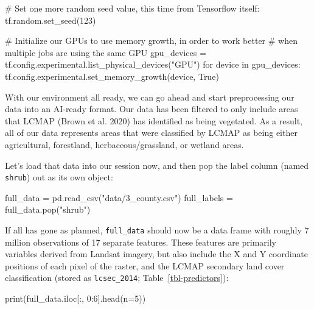 \documentclass[
  letterpaper,
  DIV=11,
  numbers=noendperiod]{scrartcl}
\newenvironment{Shaded}{\begin{snugshade}}{\end{snugshade}}
\newcommand{\BuiltInTok}[1]{\textcolor[rgb]{0.00,0.23,0.31}{#1}}
\newcommand{\CommentTok}[1]{\textcolor[rgb]{0.37,0.37,0.37}{#1}}
\newcommand{\ControlFlowTok}[1]{\textcolor[rgb]{0.00,0.23,0.31}{#1}}
\newcommand{\DecValTok}[1]{\textcolor[rgb]{0.68,0.00,0.00}{#1}}
\newcommand{\KeywordTok}[1]{\textcolor[rgb]{0.00,0.23,0.31}{#1}}
\newcommand{\NormalTok}[1]{\textcolor[rgb]{0.00,0.23,0.31}{#1}}
\newcommand{\OperatorTok}[1]{\textcolor[rgb]{0.37,0.37,0.37}{#1}}
\newcommand{\StringTok}[1]{\textcolor[rgb]{0.13,0.47,0.30}{#1}}
\newcommand{\VariableTok}[1]{\textcolor[rgb]{0.07,0.07,0.07}{#1}}
\begin{document}
\begin{Shaded}
\begin{Highlighting}[]
\CommentTok{\# Set one more random seed value, this time from Tensorflow itself:}
\NormalTok{tf.random.set\_seed(}\DecValTok{123}\NormalTok{)}

\CommentTok{\# Initialize our GPUs to use memory growth, in order to work better}
\CommentTok{\# when multiple jobs are using the same GPU}
\NormalTok{gpu\_devices }\OperatorTok{=}\NormalTok{ tf.config.experimental.list\_physical\_devices(}\StringTok{"GPU"}\NormalTok{)}
\ControlFlowTok{for}\NormalTok{ device }\KeywordTok{in}\NormalTok{ gpu\_devices:}
\NormalTok{    tf.config.experimental.set\_memory\_growth(device, }\VariableTok{True}\NormalTok{)}
\end{Highlighting}
\end{Shaded}

With our environment all ready, we can go ahead and start preprocessing
our data into an AI-ready format. Our data has been filtered to only
include areas that LCMAP (Brown et al. 2020) has identified as being
vegetated. As a result, all of our data represents areas that were
classified by LCMAP as being either agricultural, forestland,
herbaceous/grassland, or wetland areas.

Let's load that data into our session now, and then pop the label column
(named \texttt{shrub}) out as its own object:

\begin{Shaded}
\begin{Highlighting}[]
\NormalTok{full\_data }\OperatorTok{=}\NormalTok{ pd.read\_csv(}\StringTok{"data/3\_county.csv"}\NormalTok{)}
\NormalTok{full\_labels }\OperatorTok{=}\NormalTok{ full\_data.pop(}\StringTok{"shrub"}\NormalTok{)}
\end{Highlighting}
\end{Shaded}

If all has gone as planned, \texttt{full\_data} should now be a data
frame with roughly 7 million observations of 17 separate features. These
features are primarily variables derived from Landsat imagery, but also
include the X and Y coordinate positions of each pixel of the raster,
and the LCMAP secondary land cover classification (stored as
\texttt{lcsec\_2014}; Table~\ref{tbl-predictors}):

\begin{Shaded}
\begin{Highlighting}[]
\BuiltInTok{print}\NormalTok{(full\_data.iloc[:, }\DecValTok{0}\NormalTok{:}\DecValTok{6}\NormalTok{].head(n}\OperatorTok{=}\DecValTok{5}\NormalTok{))}
\end{Highlighting}
\end{Shaded}
\end{document}
